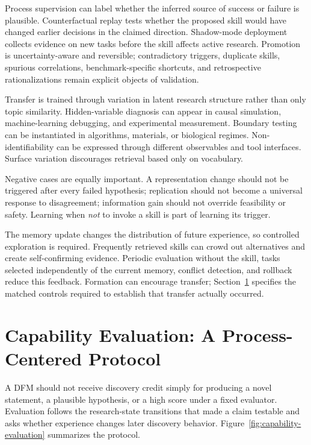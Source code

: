 \documentclass[11pt, a4paper, copyright]{google}
\begin{document}
Process supervision can label whether the inferred source of success or failure is plausible. Counterfactual replay tests whether the proposed skill would have changed earlier decisions in the claimed direction. Shadow-mode deployment collects evidence on new tasks before the skill affects active research. Promotion is uncertainty-aware and reversible; contradictory triggers, duplicate skills, spurious correlations, benchmark-specific shortcuts, and retrospective rationalizations remain explicit objects of validation.

Transfer is trained through variation in latent research structure rather than only topic similarity. Hidden-variable diagnosis can appear in causal simulation, machine-learning debugging, and experimental measurement. Boundary testing can be instantiated in algorithms, materials, or biological regimes. Non-identifiability can be expressed through different observables and tool interfaces. Surface variation discourages retrieval based only on vocabulary.

Negative cases are equally important. A representation change should not be triggered after every failed hypothesis; replication should not become a universal response to disagreement; information gain should not override feasibility or safety. Learning when \emph{not} to invoke a skill is part of learning its trigger.

The memory update changes the distribution of future experience, so controlled exploration is required. Frequently retrieved skills can crowd out alternatives and create self-confirming evidence. Periodic evaluation without the skill, tasks selected independently of the current memory, conflict detection, and rollback reduce this feedback. Formation can encourage transfer; Section~\ref{sec:evaluation} specifies the matched controls required to establish that transfer actually occurred.

\section{Capability Evaluation: A Process-Centered Protocol}
\label{sec:evaluation}

A DFM should not receive discovery credit simply for producing a novel statement, a plausible hypothesis, or a high score under a fixed evaluator. Evaluation follows the research-state transitions that made a claim testable and asks whether experience changes later discovery behavior. Figure~\ref{fig:capability-evaluation} summarizes the protocol.
\end{document}
